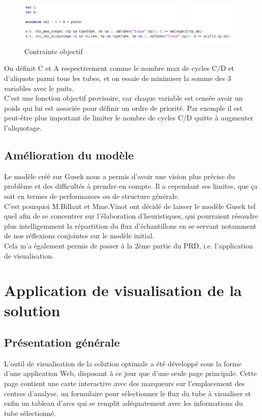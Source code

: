 \documentclass{polytech/polytech}
\numberwithin{figure}{chapter}
\begin{document}
\begin{figure}[ht]
    \centering
    \includegraphics[width=\textwidth]{pic/objectif.png}
    \caption{Contrainte objectif}
\end{figure}

On définit C et A respectivement comme le nombre max de cycles C/D et d'aliquots parmi tous les tubes, et on essaie de minimiser la somme des 3 variables avec le puits.\\
C'est une fonction objectif provisoire, car chaque variable est censée avoir un poids qui lui est associée pour définir un ordre de priorité. Par exemple il est peut-être plus important de limiter le nombre de cycles C/D quitte à augmenter l'\gls{aliquotage}.

\subsection{Amélioration du modèle}

Le modèle créé sur Gusek nous a permis d'avoir une vision plus précise du problème et des difficultés à prendre en compte. Il a cependant ses limites, que ça soit en termes de performances ou de structure générale.\\
C'est pourquoi M.Billaut et Mme.Vinot ont décidé de laisser le modèle Gusek tel quel afin de se concentrer sur l'élaboration d'heuristiques, qui pourraient résoudre plus intelligemment la répartition du flux d'échantillons en se servant notamment de nos réflexions conjointes sur le modèle initial.\\
Cela m'a également permis de passer à la 2ème partie du PRD, i.e. l'application de visualisation.

\section{Application de visualisation de la solution}

\subsection{Présentation générale}

L'outil de visualisation de la solution optimale a été développé sous la forme d'une application Web, disposant à  ce jour que d'une seule page principale. Cette page contient une carte interactive avec des marqueurs sur l'emplacement des centres d'analyse, un formulaire pour sélectionner le flux du tube à visualiser et enfin un tableau d'arcs qui se remplit adéquatement avec les informations du tube sélectionné.\\
\end{document}
